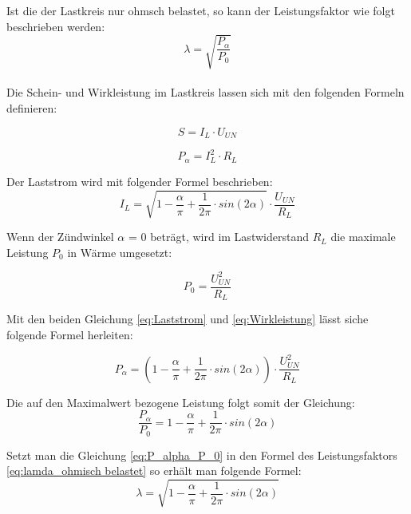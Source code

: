 Ist die der Lastkreis nur ohmsch belastet, so kann der Leistungsfaktor wie folgt beschrieben werden:
\begin{equation}\label{eq:lamda_ohmisch belastet}
\lambda =\sqrt{\frac{P_{\alpha}}{P_{0}}} 
\end{equation}
\\
Die Schein- und Wirkleistung im Lastkreis lassen sich mit den folgenden Formeln definieren:

\begin{equation}\label{eq:Scheinleistung}
S = I_L \cdot U_{UN}   
\end{equation}

\begin{equation}\label{eq:Wirkleistung}
 P_{\alpha} = I_L^2 \cdot R_L    
\end{equation}

Der Laststrom wird mit folgender Formel beschrieben:
\begin{equation}\label{eq:Laststrom}
I_L = \sqrt{1-\frac{\alpha}{\pi}+\frac{1}{2\pi} \cdot sin(2\alpha)} \cdot \frac{U_{UN}}{R_L}
\end{equation}

Wenn der Zündwinkel $\alpha$ = 0 beträgt, wird im Lastwiderstand $R_L$ die maximale Leistung $P_0$ in Wärme umgesetzt:

\begin{equation}\label{eq:Wirkleistung_bei_maximaler_alpha=0}
P_{0} = \frac{ U_{UN}^2}{R_L}  
\end{equation}

Mit den beiden Gleichung \ref{eq:Laststrom} und \ref{eq:Wirkleistung} lässt siche folgende Formel herleiten:

\begin{equation}\label{eq:p_alpha_neu}
P_{\alpha} = \left(1-\frac{\alpha}{\pi}+\frac{1}{2\pi} \cdot sin(2\alpha)\right)  \cdot \frac{U_{UN}^2}{R_L}
\end{equation}
 

Die auf den Maximalwert bezogene Leistung folgt somit der Gleichung:
\begin{equation}\label{eq:P_alpha_P_0}
\frac{P_{\alpha}}{P_0} = 1-\frac{\alpha}{\pi}+\frac{1}{2\pi} \cdot sin(2\alpha) 
\end{equation}

Setzt man die Gleichung \ref{eq:P_alpha_P_0} in den Formel des Leistungsfaktors \ref{eq:lamda_ohmisch belastet} so erhält man folgende Formel:
\begin{equation}\label{eq:lamda_p_n}
\lambda = \sqrt{1-\frac{\alpha}{\pi}+\frac{1}{2\pi} \cdot sin(2\alpha)}
\end{equation}

